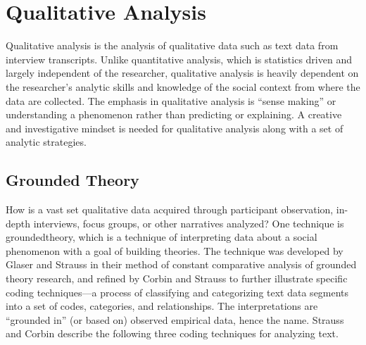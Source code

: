 \section{Qualitative Analysis}

Qualitative analysis is the analysis of qualitative data such as text data from interview transcripts. Unlike quantitative analysis, which is statistics driven and largely independent of the researcher, qualitative analysis is heavily dependent on the researcher's analytic skills and knowledge of the social context from where the data are collected. The emphasis in qualitative analysis is ``sense making'' or understanding a phenomenon rather than predicting or explaining. A creative and investigative mindset is needed for qualitative analysis along with a set of analytic strategies. 

\subsection{Grounded Theory}

How is a vast set qualitative data acquired through participant observation, in-depth interviews, focus groups, or other narratives analyzed? One technique is \gls{groundedtheory}, which is a technique of interpreting data about a social phenomenon with a goal of building theories. The technique was developed by Glaser and Strauss\cite{glaser1967discovery} in their method of constant comparative analysis of grounded theory research, and refined by Corbin and Strauss\cite{corbin1990grounded} to further illustrate specific coding techniques---a process of classifying and categorizing text data segments into a set of codes, categories, and relationships. The interpretations are ``grounded in'' (or based on) observed empirical data, hence the name. Strauss and Corbin\cite{strauss1998basics} describe the following three coding techniques for analyzing text. 

